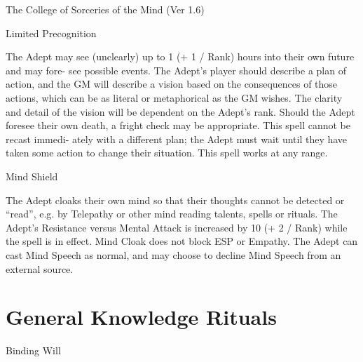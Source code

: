 \begin{Chapter}{The College of Sorceries of the Mind (Ver 1.6)}
\begin{spell}[G-6]{Limited Precognition }
\begin{effects}
The Adept may see (unclearly) up to 1 (+ 1 / Rank) hours into their
own future and may fore- see possible events.  The Adept’s player
should describe a plan of action, and the GM will describe a vision
based on the consequences of those actions, which can be as literal or
metaphorical as the GM wishes. The clarity and detail of the vision
will be dependent on the Adept’s rank.  Should the Adept foresee their
own death, a fright check may be appropriate. This spell cannot be
recast immedi- ately with a different plan; the Adept must wait until
they have taken some action to change their situation. This spell
works at any range.
\end{effects}
\end{spell}

\begin{spell}[G-7]{Mind Shield }

\begin{effects}
The Adept cloaks their own mind so that their thoughts cannot be
detected or “read”, e.g. by Telepathy or other mind reading talents,
spells or rituals.  The Adept’s Resistance versus Mental Attack is
increased by 10 (+ 2 / Rank) while the spell is in effect.  Mind Cloak
does not block ESP or Empathy.  The Adept can cast Mind Speech as
normal, and may choose to decline Mind Speech from an external source.
\end{effects}
\end{spell}

\section{General Knowledge Rituals}

\begin{ritual}[Q-1]{Binding Will }


\end{ritual}
\end{Chapter}
